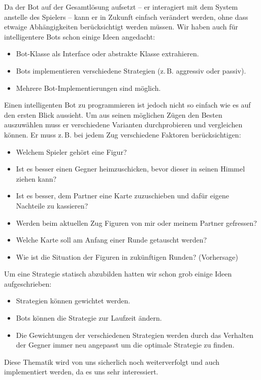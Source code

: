 \documentclass[12pt,halfparskip]{scrartcl}
\begin{document}
Da der Bot auf der Gesamtlösung aufsetzt -- er interagiert mit dem System anstelle des Spielers -- kann er in Zukunft einfach verändert werden, ohne dass etwaige Abhängigkeiten berücksichtigt werden müssen. Wir haben auch für intelligentere Bots schon einige Ideen angedacht:
\begin{itemize}
	\item Bot-Klasse als Interface oder abstrakte Klasse extrahieren.
	\item Bots implementieren verschiedene Strategien (z.\,B. aggressiv oder passiv).
	\item Mehrere Bot-Implementierungen sind möglich.
\end{itemize}

Einen intelligenten Bot zu programmieren ist jedoch nicht so einfach wie es auf den ersten Blick aussieht. Um aus seinen möglichen Zügen den Besten auszuwählen muss er verschiedene Varianten durchprobieren und vergleichen können. Er muss z.\,B. bei jedem Zug verschiedene Faktoren berücksichtigen:
\begin{itemize}
	\item Welchem Spieler gehört eine Figur?
	\item Ist es besser einen Gegner heimzuschicken, bevor dieser in seinen Himmel ziehen kann?
	\item Ist es besser, dem Partner eine Karte zuzuschieben und dafür eigene Nachteile zu kassieren?
	\item Werden beim aktuellen Zug Figuren von mir oder meinem Partner gefressen?
	\item Welche Karte soll am Anfang einer Runde getauscht werden?
	\item Wie ist die Situation der Figuren in zukünftigen Runden? (Vorhersage)
\end{itemize}

Um eine Strategie statisch abzubilden hatten wir schon grob einige Ideen aufgeschrieben:
\begin{itemize}
	\item Strategien können gewichtet werden.
	\item Bots können die Strategie zur Laufzeit ändern.
	\item Die Gewichtungen der verschiedenen Strategien werden durch das Verhalten der Gegner immer neu angepasst um die optimale Strategie zu finden.
\end{itemize}

Diese Thematik wird von uns sicherlich noch weiterverfolgt und auch implementiert werden, da es uns sehr interessiert.
\end{document}

